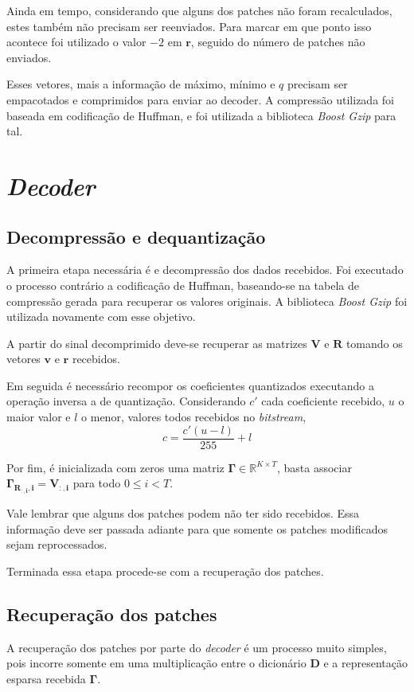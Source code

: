 \documentclass[cic,tc]{iiufrgs}
\renewcommand{\vec}[1]{\bm{#1}}
\newcommand{\mat}[1]{\bm{#1}}
\begin{document}
Ainda em tempo, considerando que alguns dos patches não foram recalculados, estes 
também não precisam ser reenviados. 
Para marcar em que ponto isso acontece foi utilizado o valor $-2$ em $\vec{r}$, 
seguido do número de patches não enviados.

Esses vetores, mais a informação de máximo, mínimo e $q$ precisam ser empacotados 
e comprimidos para enviar ao decoder.
A compressão utilizada foi baseada em codificação de Huffman, e foi utilizada 
a biblioteca \textit{Boost Gzip} \cite{Boost} para tal.

\section{\textit{Decoder}}

\subsection{Decompressão e dequantização}
\label{sec:decdeq}

A primeira etapa necessária é e decompressão dos dados recebidos. 
Foi executado o processo contrário a codificação de Huffman, 
baseando-se na tabela de compressão gerada para recuperar os valores originais.
A biblioteca \textit{Boost Gzip} \cite{Boost} foi utilizada novamente com esse objetivo.

A partir do sinal decomprimido deve-se recuperar as matrizes $\mat{V}$ e $\mat{R}$
tomando os vetores $\vec{v}$ e $\vec{r}$ recebidos.

Em seguida é necessário recompor os coeficientes quantizados 
executando a operação inversa a de quantização.
Considerando $c'$ cada coeficiente recebido, $u$ o maior valor e $l$ o menor, 
valores todos recebidos no \textit{bitstream},
\begin{equation*}
    c = \frac{c' (u - l)}{255} + l
\end{equation*}

Por fim, é inicializada com zeros uma matriz $\mat{\Gamma} \in \mathbb{R}^{K \times T}$,
basta associar $\mat{\Gamma_{\mat{R_{:,i}}, i}} = \mat{V_{:,i}}$ para todo $0 \le i < T$.

Vale lembrar que alguns dos patches podem não ter sido recebidos. 
Essa informação deve ser passada adiante para que somente os patches modificados
sejam reprocessados.

Terminada essa etapa procede-se com a recuperação dos patches.

\subsection{Recuperação dos patches}
A recuperação dos patches por parte do \textit{decoder} é um processo muito simples,
pois incorre somente em uma multiplicação entre o dicionário $\mat{D}$ e a 
representação esparsa recebida $\mat{\Gamma}$.
\end{document}
